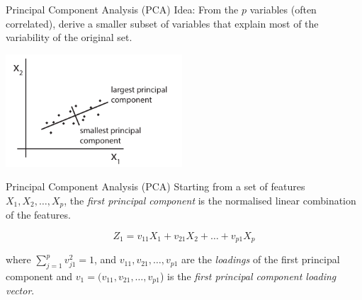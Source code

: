 \documentclass[notes]{beamer}          %
\begin{document}
\begin{frame}{Principal Component Analysis (PCA)}
Idea: From the $p$ variables (often correlated), derive a smaller subset of variables that explain most of the variability of the original set.
\vspace{2mm} 
\begin{center}
\includegraphics[height=4.2cm]{../figures/week_6/PrincipalComponetDrawing.pdf}  
\end{center}
\end{frame}

\begin{frame}{Principal Component Analysis (PCA)}
Starting from a set of features $X_1, X_2, \dots, X_p$, the \textit{first principal component} is the normalised linear combination of the features.

\begin{equation*}
	Z_1 =v_{11}X_1 + v_{21}X_2 + \dots + v_{p1}X_p
\end{equation*}

where $\sum_{j=1}^{p}v_{j1}^2=1$, and $v_{11}, v_{21}, \dots, v_{p1}$ are the \textit{loadings} of the first principal component and $v_1=(v_{11}, v_{21}, \dots, v_{p1}$) is the \textit{first principal component loading vector}.
\end{frame}
\end{document}
